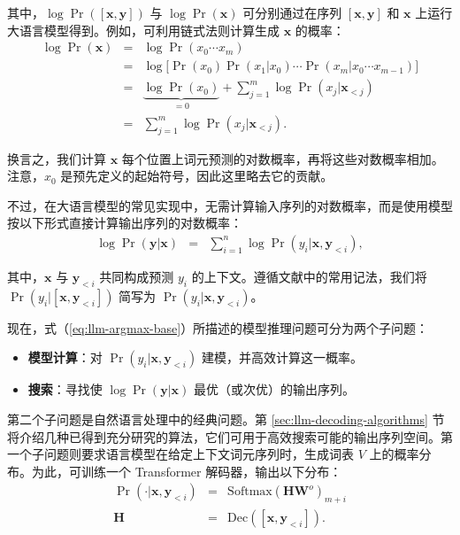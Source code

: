 \noindent 其中，$\log \Pr([\mathbf{x},\mathbf{y}])$ 与 $\log \Pr(\mathbf{x})$ 可分别通过在序列 $[\mathbf{x},\mathbf{y}]$ 和 $\mathbf{x}$ 上运行大语言模型得到。例如，可利用链式法则计算生成 $\mathbf{x}$ 的概率：
\begin{eqnarray}
\log \Pr(\mathbf{x}) & = & \log \Pr(x_0\cdots x_m) \nonumber \\
                     & = & \log \big[ \Pr(x_0) \Pr(x_1|x_0) \cdots \Pr(x_m|x_0\cdots x_{m-1}) \big] \nonumber \\
                     & = & \underbrace{\log \Pr(x_0)}_{=0} + \sum_{j=1}^{m} \log \Pr(x_j|\mathbf{x}_{<j}) \nonumber \\
                     & = & \sum_{j=1}^{m} \log \Pr(x_j|\mathbf{x}_{<j}).
\end{eqnarray}

\noindent 换言之，我们计算 $\mathbf{x}$ 每个位置上词元预测的对数概率，再将这些对数概率相加。注意，$x_0$ 是预先定义的起始符号，因此这里略去它的贡献。

不过，在大语言模型的常见实现中，无需计算输入序列的对数概率，而是使用模型按以下形式直接计算输出序列的对数概率：
\begin{eqnarray}
\log \Pr(\mathbf{y}|\mathbf{x}) & = & \sum_{i=1}^{n} \log \Pr(y_i|\mathbf{x},\mathbf{y}_{<i}), \label{eq:llm-log-prob-y-x-sum}
\end{eqnarray}

\noindent 其中，$\mathbf{x}$ 与 $\mathbf{y}_{<i}$ 共同构成预测 $y_i$ 的上下文。遵循文献中的常用记法，我们将 $\Pr(y_i|[\mathbf{x},\mathbf{y}_{<i}])$ 简写为 $\Pr(y_i|\mathbf{x},\mathbf{y}_{<i})$。

\vspace{0.3em}
现在，式（\ref{eq:llm-argmax-base}）所描述的模型推理问题可分为两个子问题：

\begin{itemize}
\item \vspace{0.3em} \textbf{模型计算}：对 $\Pr(y_i|\mathbf{x},\mathbf{y}_{<i})$ 建模，并高效计算这一概率。
\item \vspace{0.3em} \textbf{搜索}：寻找使 $\log \Pr(\mathbf{y}|\mathbf{x})$ 最优（或次优）的输出序列。
\end{itemize}
\vspace{0.3em}

第二个子问题是自然语言处理中的经典问题。第 \ref{sec:llm-decoding-algorithms} 节将介绍几种已得到充分研究的算法，它们可用于高效搜索可能的输出序列空间。第一个子问题则要求语言模型在给定上下文词元序列时，生成词表 $V$ 上的概率分布。为此，可训练一个 Transformer 解码器，输出以下分布：
\begin{eqnarray}
\Pr(\cdot|\mathbf{x},\mathbf{y}_{<i}) & = & \mathrm{Softmax}(\mathbf{H} \mathbf{W}^{o})_{m+i} \label{eq:llm-token-predic-prob-softmax} \\
\mathbf{H} & = & \mathrm{Dec}([\mathbf{x},\mathbf{y}_{<i}]).
\end{eqnarray}

